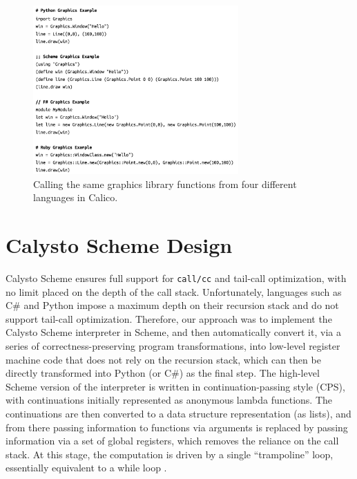 \documentclass[acmsmall,screen,authorversion]{acmart}
\begin{document}

\begin{figure}
  \includegraphics[width=0.7\textwidth]{graphics-scripts.jpg}
  \caption{Calling the same graphics library functions from four different languages in Calico.}
  \label{fig:scripts}
  \Description{}
\end{figure}


\section{Calysto Scheme Design}

Calysto Scheme ensures full support for \texttt{call/cc} and tail-call
optimization, with no limit placed on the depth of the call stack.
Unfortunately, languages such as C\# and Python impose a maximum depth on their
recursion stack and do not support tail-call optimization.  Therefore, our
approach was to implement the Calysto Scheme interpreter in Scheme, and then
automatically convert it, via a series of correctness-preserving program
transformations, into low-level register machine code that does not rely on the
recursion stack, which can then be directly transformed into Python (or C\#) as
the final step.  The high-level Scheme version of the interpreter is written in
continuation-passing style (CPS), with continuations initially represented as
anonymous lambda functions.  The continuations are then converted to a data
structure representation (as lists), and from there passing information to
functions via arguments is replaced by passing information via a set of global
registers, which removes the reliance on the call stack.  At this stage, the
computation is driven by a single ``trampoline'' loop, essentially equivalent
to a while loop \cite{Ganz99, EOPL3}.
\end{document}
